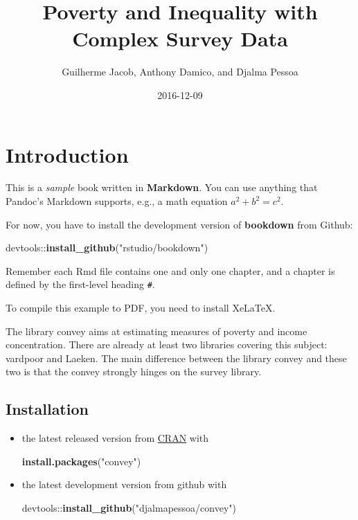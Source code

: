 \documentclass[]{book}
\title{Poverty and Inequality with Complex Survey Data}
\author{Guilherme Jacob, Anthony Damico, and Djalma Pessoa}
\date{2016-12-09}
\newenvironment{Shaded}{\begin{snugshade}}{\end{snugshade}}
\newcommand{\KeywordTok}[1]{\textcolor[rgb]{0.13,0.29,0.53}{\textbf{{#1}}}}
\newcommand{\StringTok}[1]{\textcolor[rgb]{0.31,0.60,0.02}{{#1}}}
\newcommand{\NormalTok}[1]{{#1}}
\begin{document}
\maketitle

{
\setcounter{tocdepth}{1}
\tableofcontents
}
\chapter{Introduction}\label{introduction}

This is a \emph{sample} book written in \textbf{Markdown}. You can use
anything that Pandoc's Markdown supports, e.g., a math equation
\(a^2 + b^2 = c^2\).

For now, you have to install the development version of
\textbf{bookdown} from Github:

\begin{Shaded}
\begin{Highlighting}[]
\NormalTok{devtools::}\KeywordTok{install_github}\NormalTok{(}\StringTok{"rstudio/bookdown"}\NormalTok{)}
\end{Highlighting}
\end{Shaded}

Remember each Rmd file contains one and only one chapter, and a chapter
is defined by the first-level heading \texttt{\#}.

To compile this example to PDF, you need to install XeLaTeX.

The library convey aims at estimating measures of poverty and income
concentration. There are already at least two libraries covering this
subject: vardpoor and Laeken. The main difference between the library
convey and these two is that the convey strongly hinges on the survey
library.

\section{Installation}\label{install}

\begin{itemize}
\item
  the latest released version from
  \href{https://CRAN.R-project.org/package=convey}{CRAN} with

\begin{Shaded}
\begin{Highlighting}[]
\KeywordTok{install.packages}\NormalTok{(}\StringTok{"convey"}\NormalTok{)}
\end{Highlighting}
\end{Shaded}
\item
  the latest development version from github with

\begin{Shaded}
\begin{Highlighting}[]
\NormalTok{devtools::}\KeywordTok{install_github}\NormalTok{(}\StringTok{"djalmapessoa/convey"}\NormalTok{)}
\end{Highlighting}
\end{Shaded}
\end{itemize}
\end{document}
